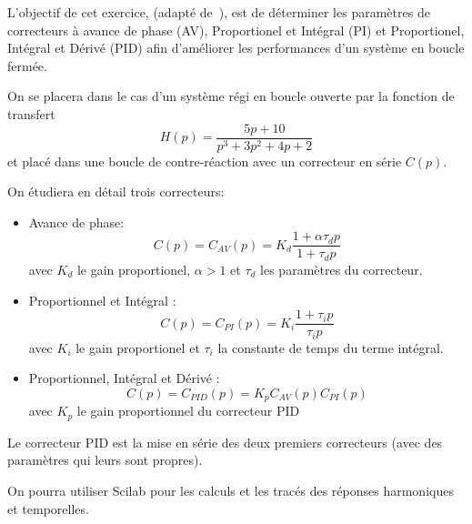 L'objectif de cet exercice, (adapté de~\cite{Bourles}), est de déterminer les 
paramètres de correcteurs à avance de phase (AV), Proportionel et Intégral (PI) 
et Proportionel, Intégral et Dérivé (PID) afin d'améliorer les performances 
d'un système en boucle fermée.

On se placera dans le cas d'un système régi en boucle ouverte par la fonction 
de transfert
\[
    H(p)=\dfrac{5p+10}{p^3+3p^2+4p+2}
\]
et placé dans une boucle de contre-réaction avec un correcteur en série $C(p)$.
\begin{center}
    
\end{center}
On étudiera en détail trois correcteurs:
\begin{itemize}
    \item Avance de phase: 
\[
    C(p)=C_{AV}(p)=K_d\dfrac{1+\alpha\tau_d p}{1+\tau_d p}
\]
    avec $K_d$ le gain proportionel, $\alpha>1$ et $\tau_d$ les paramètres 
    du correcteur.
    \item Proportionnel et Intégral : 
\[ 
        C(p)=C_{PI}(p)=K_i\dfrac{1+\tau_i p}{\tau_i p}
\]
    avec $K_i$ le gain proportionel et $\tau_i$ la constante de temps du 
    terme intégral.
    \item Proportionnel, Intégral et Dérivé : 
\[
    C(p)=C_{PID}(p)=K_pC_{AV}(p)C_{PI}(p)
\]
    avec $K_p$ le gain proportionnel du correcteur PID
\end{itemize}
Le correcteur PID est la mise en série des deux premiers correcteurs 
(avec des paramètres qui leurs sont propres).

On pourra utiliser Scilab pour les calculs et les tracés des réponses 
harmoniques et temporelles.
\clearpage
